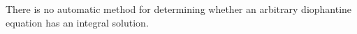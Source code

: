 There is no automatic method for determining whether an arbitrary diophantine equation has an integral solution.
